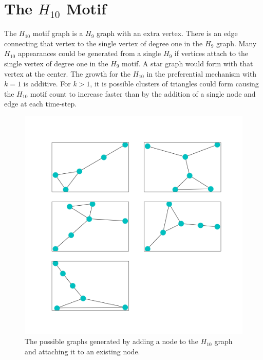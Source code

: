 \section{The \texorpdfstring{$H_{10}$}{H10} Motif}
The $H_{10}$ motif graph is a $H_{9}$ graph with an extra vertex. There is an edge connecting that vertex to the 
single vertex of degree one in the $H_{9}$ graph. Many $H_{10}$ appearances could be generated from a single $H_{9}$ if vertices
attach to the single vertex of degree one in the $H_{9}$ motif. A star graph would form
with that vertex at the center. The growth for the $H_{10}$ in the preferential mechanism with $k=1$ is additive.
For $k>1$, it is possible clusters of triangles could form causing the $H_{10}$ motif count to increase faster than by the addition of a single node and edge at each time-step. 

\begin{figure}[!ht]
    \includegraphics[width=12cm]{Images/H10_evolution.png}
    \centering
    \caption{The possible graphs generated by adding a node to the $H_{10}$ graph 
    and attaching it to an existing node.}
\end{figure}

